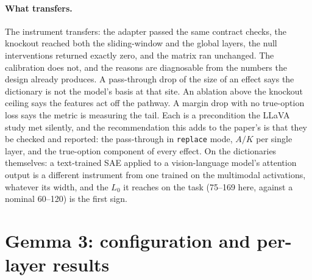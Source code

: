 \documentclass[11pt,a4paper]{article}
\begin{document}
\paragraph{What transfers.} The instrument transfers: the adapter passed the
same contract checks, the knockout reached both the sliding-window and the
global layers, the null interventions returned exactly zero, and the matrix
ran unchanged. The calibration does not, and the reasons are diagnosable from
the numbers the design already produces. A pass-through drop of the size of an
effect says the dictionary is not the model's basis at that site. An ablation
above the knockout ceiling says the features act off the pathway. A margin
drop with no true-option loss says the metric is measuring the tail. Each is a
precondition the LLaVA study met silently, and the recommendation this adds to
the paper's is that they be checked and reported: the pass-through in
\texttt{replace} mode, $A/K$ per single layer, and the true-option component
of every effect. On the dictionaries themselves: a text-trained SAE applied to
a vision-language model's attention output is a different instrument from one
trained on the multimodal activations, whatever its width, and the $L_0$ it
reaches on the task (75--169 here, against a nominal 60--120) is the first
sign.

\ifdefined\gemmastandalone\appendix\fi
\section{Gemma 3: configuration and per-layer results}
\label{app:gemma}
\end{document}
